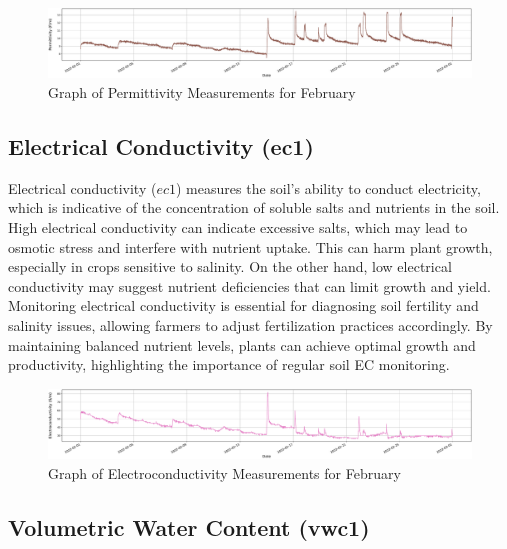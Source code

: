 \begin{figure}[htbp]
    \centering
    \includegraphics[width=15 cm]{4_ChapterMaterials/figuras/train_data_Permittivity.pdf}
    \caption{Graph of Permittivity Measurements for February}
    \end{figure}

\subsection{Electrical Conductivity (ec1)}

Electrical conductivity (\( ec1 \)) measures the soil's ability to conduct electricity, which is indicative of the concentration of soluble salts and nutrients in the soil. High electrical conductivity can indicate excessive salts, which may lead to osmotic stress and interfere with nutrient uptake. This can harm plant growth, especially in crops sensitive to salinity. On the other hand, low electrical conductivity may suggest nutrient deficiencies that can limit growth and yield. Monitoring electrical conductivity is essential for diagnosing soil fertility and salinity issues, allowing farmers to adjust fertilization practices accordingly. By maintaining balanced nutrient levels, plants can achieve optimal growth and productivity, highlighting the importance of regular soil EC monitoring.

\begin{figure}[htbp]
    \centering
    \includegraphics[width=15 cm]{4_ChapterMaterials/figuras/train_data_Electroconductivity.pdf}
    \caption{Graph of Electroconductivity Measurements for February}
    \end{figure}

\subsection{Volumetric Water Content (vwc1)}

